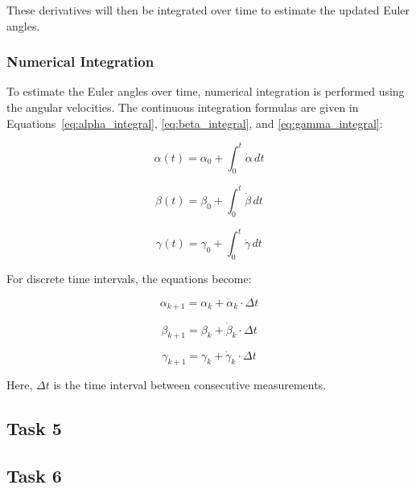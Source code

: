 \documentclass[12pt]{article}
\begin{document}
These derivatives will then be integrated over time to estimate the updated Euler angles.

\subsubsection{Numerical Integration}
To estimate the Euler angles over time, numerical integration is performed using the angular velocities. The continuous integration formulas are given in Equations~\eqref{eq:alpha_integral}, \eqref{eq:beta_integral}, and \eqref{eq:gamma_integral}:

\begin{equation}
\label{eq:alpha_integral}
\alpha(t) = \alpha_0 + \int_0^t \dot{\alpha} \, dt
\end{equation}

\begin{equation}
\label{eq:beta_integral}
\beta(t) = \beta_0 + \int_0^t \dot{\beta} \, dt
\end{equation}

\begin{equation}
\label{eq:gamma_integral}
\gamma(t) = \gamma_0 + \int_0^t \dot{\gamma} \, dt
\end{equation}

For discrete time intervals, the equations become:

\begin{equation}
\label{eq:alpha_discrete}
\alpha_{k+1} = \alpha_k + \dot{\alpha}_k \cdot \Delta t
\end{equation}

\begin{equation}
\label{eq:beta_discrete}
\beta_{k+1} = \beta_k + \dot{\beta}_k \cdot \Delta t
\end{equation}

\begin{equation}
\label{eq:gamma_discrete}
\gamma_{k+1} = \gamma_k + \dot{\gamma}_k \cdot \Delta t
\end{equation}

Here, \( \Delta t \) is the time interval between consecutive measurements.

\subsection{Task 5}


\subsection{Task 6}
\end{document}
